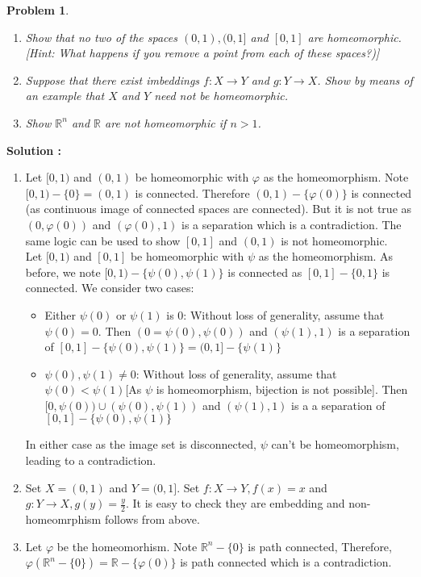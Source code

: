\documentclass{article}
\newtheorem{problem}{Problem}
\numberwithin{problem}{section}
\begin{document}
\begin{tcolorbox}
\begin{problem}
  \begin{enumerate}
      \item Show that no two of the spaces $(0, 1), (0, 1]$ and $[0, 1]$ are homeomorphic.
[Hint: What happens if you remove a point from each of these spaces?)]
    \item Suppose that there exist imbeddings $f : X \to Y$ and $g : Y \to X$. Show by
means of an example that $X$ and $Y$ need not be homeomorphic.
    \item Show $\mathbb R^n$ and $\mathbb R$ are not homeomorphic if $n > 1$.
  \end{enumerate}
\end{problem}
\end{tcolorbox}
\textbf{Solution :}
\begin{enumerate}
    \item Let $[0,1)$ and $(0,1)$ be homeomorphic with $\varphi$ as the homeomorphism. Note $[0,1)-\{0\}=(0,1)$ is connected. Therefore $(0,1)-\{\varphi(0)\}$ is connected (as continuous image of connected spaces are connected). But it is not true as $(0,\varphi(0))$ and $(\varphi(0),1)$ is a separation which is a contradiction. The same logic can be used to show $[0,1]$ and $(0,1)$ is not homeomorphic. \\
Let $[0,1)$ and $[0,1]$ be homeomorphic with $\psi$ as the homeomorphism. As before, we note $[0,1)-\{\psi(0),\psi(1)\}$ is connected as $[0,1]-\{0,1\}$ is connected. We consider two cases:
\begin{itemize}
    \item Either $\psi(0)$ or $\psi(1)$ is $0$: Without loss of generality, assume that $\psi(0)=0$. Then $(0=\psi(0),\psi(0))$ and $(\psi(1),1)$ is a separation of $[0,1]-\{\psi(0),\psi(1)\}=(0,1]-\{\psi(1)\}$
    \item $\psi(0),\psi(1)\ne 0$: Without loss of generality, assume that $\psi(0)<\psi(1)$[As $\psi$ is homeomorphism, bijection is not possible]. Then $[0,\psi(0))\cup(\psi(0),\psi(1))$ and $(\psi(1),1)$ is a a separation of $[0,1]-\{\psi(0),\psi(1)\}$
\end{itemize}
In either case as the image set is disconnected, $\psi$ can't be homeomorphism, leading to a contradiction.
\item Set $X=(0,1)$ and $Y=(0,1]$. Set $f:X\to Y,f(x)=x$ and $g:Y\to X,g(y)=\frac{y}{2}$. It is easy to check they are embedding and non-homeomrphism follows from above. 
\item Let $\varphi$ be the homeomorhism. Note $\mathbb R^n-\{0\}$ is path connected, Therefore, $\varphi(\mathbb R^n-\{0\})=\mathbb R-\{\varphi(0)\}$ is path connected which is a contradiction.
\end{enumerate}
\end{document}
